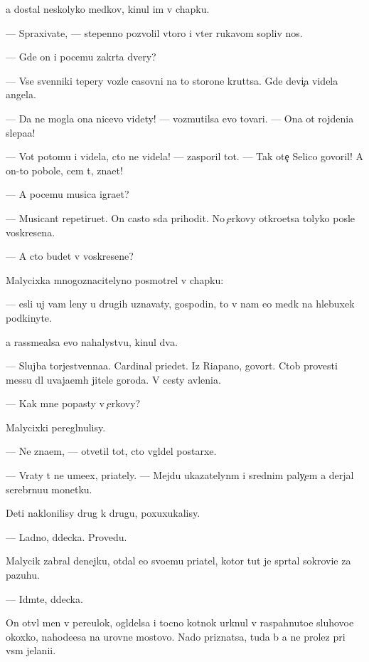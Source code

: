 \documentclass[10pt]{book}
\begin{document}
{\Y}a dostal neskolyko med{\ia}kov, kinul im v chapku.

— Spraxiva{\y}te, — stepenno pozvolil vtoro{\y} i v{\yi}ter rukavom sopliv{\yi}{\y} nos.

— Gde on i pocemu zakr{\yi}ta dvery?

— Vse sv{\ia}{\x}enniki tepery vozle casovni na to{\y} storone krut{\ia}tsa. Gde devi{\c}a videla angela.

— Da ne mogla ona nicevo videty! — vozmutilsa {\y}evo tovari{\x}. — Ona ot rojdeni{\y}a slepa{\y}a!

— Vot potomu i videla, cto ne videla! — zasporil tot. — Tak ote{\c} Selico govoril! A on-to pobole, cem t{\yi}, zna{\y}et!

— A pocemu musica igra{\y}et?

— Musicant repetiru{\y}et. On casto s{\io}da prihodit. No {\c}erkovy otkro{\y}etsa tolyko posle voskresen{\y}a.

— A cto budet v voskresen{\y}e?

Malycixka mnogoznacitelyno posmotrel v chapku:

— {\Y}esli uj vam leny u drugih uznavaty, gospodin, to v{\yi} nam {\y}e{\x}o med{\ia}k na hlebuxek podkinyte.

{\Y}a rassme{\y}alsa {\y}evo nahalystvu, kinul dva.

— Slujba torjestvenna{\y}a. Cardinal pri{\y}edet. Iz Riapano, govor{\ia}t. Ctob{\yi} provesti messu dl{\ia} uvaja{\y}em{\yi}h jitele{\y} goroda. V cesty {\y}avleni{\y}a.

— Kak mne popasty v {\c}erkovy?

Malycixki peregl{\ia}nulisy.

— Ne zna{\y}em, — otvetil tot, cto v{\yi}gl{\ia}del postarxe.

— Vraty t{\yi} ne ume{\y}ex, pri{\y}ately. — Mejdu ukazatelyn{\yi}m i srednim paly{\c}em {\y}a derjal serebr{\ia}nu{\y}u monetku.

Deti naklonilisy drug k drugu, poxuxukalisy.

— Ladno, d{\ia}decka. Provedu.

Malycik zabral denejku, otdal {\y}e{\y}o svo{\y}emu pri{\y}atel{\io}, kotor{\yi}{\y} tut je spr{\ia}tal sokrovi{\x}e za pazuhu.

— Id{\e}mte, d{\ia}decka.

On otv{\e}l men{\ia} v pereulok, ogl{\ia}delsa i tocno kot{\e}nok {\y}urknul v raspahnuto{\y}e sluhovo{\y}e okoxko, nahod{\ia}{\x}e{\y}esa na urovne mostovo{\y}. Nado priznatsa, tuda b{\yi} {\y}a ne prolez pri vs{\e}m jelani{\y}i.
\end{document}
